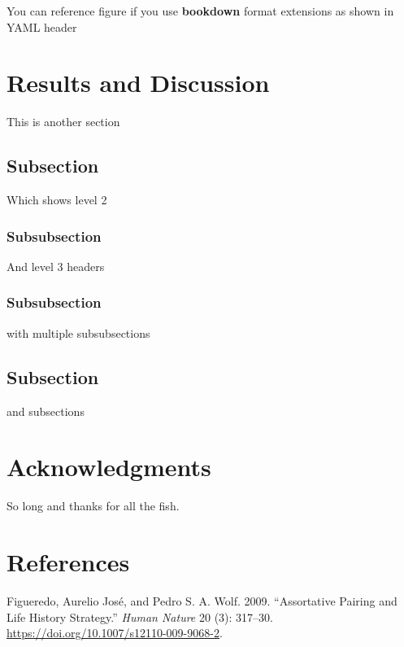 \documentclass[fleqn,10pt,lineno]{wlpeerj} %
\newlength{\cslhangindent}
\newenvironment{CSLReferences}[2] %
 {%
  \setlength{\parindent}{0pt}
  \ifodd #1 \everypar{\setlength{\hangindent}{\cslhangindent}}\ignorespaces\fi
  \ifnum #2 > 0
  \setlength{\parskip}{#2\baselineskip}
  \fi
 }%
 {}
\begin{document}
You can reference figure if you use \textbf{bookdown} format extensions
as shown in YAML header

\hypertarget{results-and-discussion}{%
\section*{Results and Discussion}\label{results-and-discussion}}

This is another section

\hypertarget{subsection-2}{%
\subsection*{Subsection}\label{subsection-2}}

Which shows level 2

\hypertarget{subsubsection}{%
\subsubsection*{Subsubsection}\label{subsubsection}}

And level 3 headers

\hypertarget{subsubsection-1}{%
\subsubsection*{Subsubsection}\label{subsubsection-1}}

with multiple subsubsections

\hypertarget{subsection-3}{%
\subsection*{Subsection}\label{subsection-3}}

and subsections

\hypertarget{acknowledgments}{%
\section*{Acknowledgments}\label{acknowledgments}}

So long and thanks for all the fish.

\hypertarget{references}{%
\section*{References}\label{references}}

\hypertarget{refs}{}
\begin{CSLReferences}{1}{0}
\leavevmode{}%
Figueredo, Aurelio José, and Pedro S. A. Wolf. 2009. {``Assortative
Pairing and Life History Strategy.''} \emph{Human Nature} 20 (3):
317--30. \url{https://doi.org/10.1007/s12110-009-9068-2}.

\end{CSLReferences}
\end{document}
